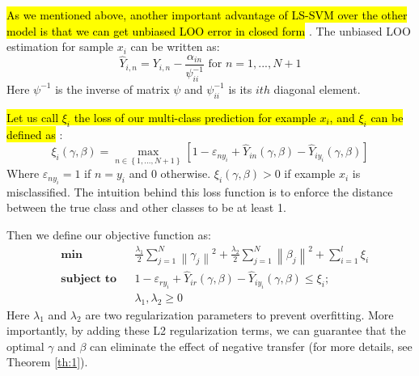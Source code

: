 \hl{As we mentioned above, another important advantage of LS-SVM over the other model is that we can get unbiased LOO error in closed form} \cite{cawley2006leave}. The unbiased LOO estimation for sample $x_i$ can be written as:
\begin{equation}
{\hat Y_{i,n}} = {Y_{i,n}} - \frac{{{\alpha _{in}}}}{{\psi_{ii}^{ - 1}}}{\text{    for   }}n = 1,...,N + 1
\end{equation}
Here $\psi^{-1}$ is the inverse of matrix $\psi$ and  $\psi_{ii}^{-1}$ is its $ith$ diagonal element. 

\hl{Let us call $\xi_i$ the loss of our multi-class prediction for example $x_i$, and $\xi_i$ can be defined as} \cite{crammer2002algorithmic}:
\begin{equation}\label{eq:train_loss}
\xi_i(\gamma,\beta) = \mathop {\max }\limits_{n \in \left\lbrace 1,...,N+1 \right\rbrace } {\left[ {1 - {\varepsilon _{n{y_i}}} + {{\hat Y}_{in}}\left( {\gamma ,\beta } \right) - {{\hat Y}_{i{y_i}}}\left( {\gamma ,\beta } \right)} \right]}
\end{equation}
Where $\varepsilon _{n{y_i}}=1$ if $n=y_i$ and 0 otherwise. $\xi_i(\gamma,\beta)>0$ if example $x_i$ is misclassified. The intuition behind this loss function is to enforce the distance between the true class and other classes to be at least 1.

Then we define our objective function as:
\begin{equation}\label{loss}
\begin{aligned}
& \textbf{min}
& & \frac{{{\lambda _1}}}{2}\sum\limits_{j = 1}^N {{{\left\| {{\gamma _j}} \right\|}^2}}  + \frac{{{\lambda _2}}}{2}\sum\limits_{j = 1}^N {{{\left\| {{\beta _j}} \right\|}^2}}  + \sum\limits_{i = 1}^l {{\xi _i}}   \\
& \textbf{subject to}
& & 1 - {\varepsilon _{r{y_i}}} + {\hat Y_{ir}}\left( {\gamma ,\beta } \right) - {\hat Y_{i{y_i}}}\left( {\gamma ,\beta } \right) \le {\xi_i};\\
& & &\lambda_1,\lambda_2 \ge 0
\end{aligned}
\end{equation}
Here $\lambda_1$ and $\lambda_2$ are two regularization parameters to prevent overfitting. More importantly, by adding these L2 regularization terms, we can guarantee that the optimal $\gamma$ and $\beta$ can eliminate the effect of negative transfer (for more details, see Theorem \ref{th:1}). 

